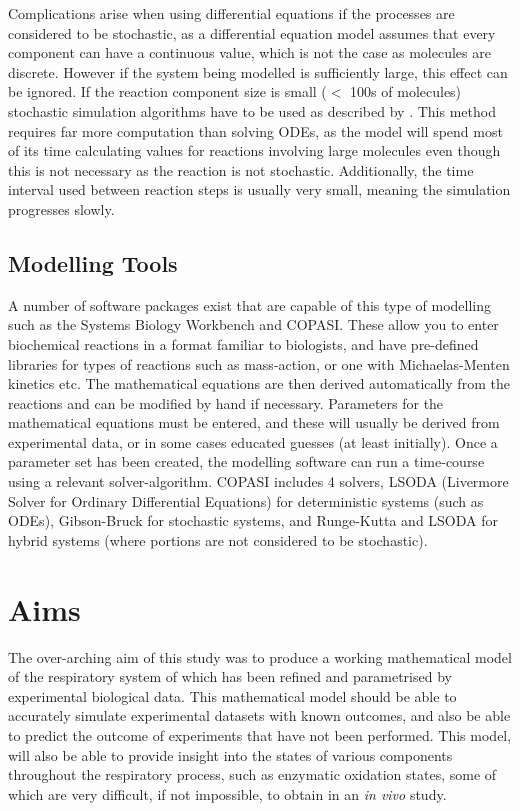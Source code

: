Complications arise when using differential equations if the processes are considered to be stochastic, as a differential equation model assumes that every component can have a continuous value, which is not the case as molecules are discrete. However if the system being modelled is sufficiently large, this effect can be ignored. If the reaction component size is small ($<$ 100s of molecules) stochastic simulation algorithms have to be used as described by \citet{Gillespie1977}. This method requires far more computation than solving ODEs, as the model will spend most of its time calculating values for reactions involving large molecules even though this is not necessary as the reaction is not stochastic. Additionally, the time interval used between reaction steps is usually very small, meaning the simulation progresses slowly\cite{Klipp2005}.

\subsection{Modelling Tools}

A number of software packages exist that are capable of this type of modelling such as the Systems Biology Workbench\cite{Sauro2003} and COPASI\cite{Hoops2006}. These allow you to enter biochemical reactions in a format familiar to biologists, and have pre-defined libraries for types of reactions such as mass-action, or one with Michaelas-Menten kinetics etc. The mathematical equations are then derived automatically from the reactions and can be modified by hand if necessary. Parameters for the mathematical equations must be entered, and these will usually be derived from experimental data, or in some cases educated guesses (at least initially). Once a parameter set has been created, the modelling software can run a time-course using a relevant solver-algorithm. COPASI includes 4 solvers,  LSODA (Livermore Solver for Ordinary Differential Equations)\cite{Radhakrishnan1993} for deterministic systems (such as ODEs), Gibson-Bruck\cite{Gibson2000} for stochastic systems, and Runge-Kutta and LSODA for hybrid systems (where portions are not considered to be stochastic).

\section{Aims}
The over-arching aim of this study was to produce a working mathematical model of the respiratory system of \Nm{} which has been refined and parametrised by experimental biological data. This mathematical model should be able to accurately simulate experimental datasets with known outcomes, and also be able to predict the outcome of experiments that have not been performed. This model, will also be able to provide insight into the states of various components throughout the respiratory process, such as enzymatic oxidation states, some of which are very difficult, if not impossible, to obtain in an \textit{in vivo} study.

